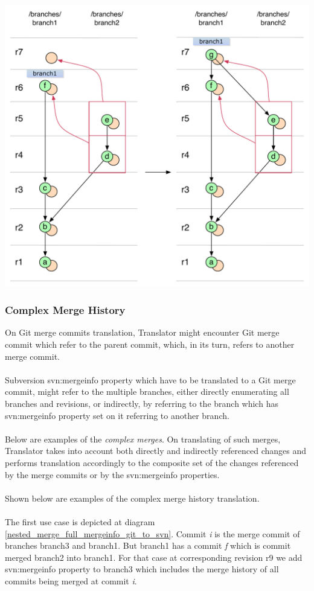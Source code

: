 \begin{center}
\includegraphics[width=\textwidth]{img/diagrams/merge_commit_on_double_cherry_pick_svn_to_git.pdf}%
\label{merge_commit_on_double_cherry_pick_svn_to_git}%
\end{center}

\newpage
\subsubsection{Complex Merge History}
On Git merge commits translation, Translator might encounter Git merge commit which refer to the parent commit, which,
in its turn, refers to another merge commit.
\\\\
Subversion svn:mergeinfo property which have to be translated to a Git merge commit, might refer to the multiple branches,
either directly enumerating all branches and revisions, or indirectly, by referring to the branch which has svn:mergeinfo property set on it referring to another branch.
\\\\
Below are examples of the \emph{complex merges}. On translating of such merges, Translator takes into account both
directly and indirectly referenced changes and performs translation accordingly to the composite set of the 
changes referenced by the merge commits or by the svn:mergeinfo properties.
\\\\
Shown below are examples of the complex merge history translation.
\\\\
The first use case is depicted at diagram \ref{nested_merge_full_mergeinfo_git_to_svn}. 
Commit \emph{i} is the merge commit of branches branch3 and branch1. 
But branch1 has a commit \emph{f} which is commit merged branch2 into branch1. 
For that case at corresponding revision r9 we add svn:mergeinfo property to branch3 which includes the merge history of all commits being merged at commit \emph{i}.

